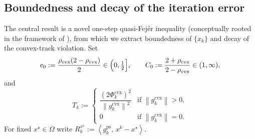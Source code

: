 \documentclass[]{interact}
\theoremstyle{plain}
\theoremstyle{definition}
\theoremstyle{remark}
\newcommand{\norm}[1]{\left\lVert #1 \right\rVert}
\newcommand{\inner}[2]{\left\langle #1,\, #2 \right\rangle}
\newcommand{\cvx}{\mathrm{cvx}}
\newcommand{\ps}{\mathrm{ps}}
\begin{document}
\subsection{Boundedness and decay of the iteration error}\label{ssec:bounded}
The central result is a novel one-step quasi-Fej\'er inequality (conceptually rooted in the framework of \citealt{combettes2001quasifejer}), from which we extract boundedness of $\{x_k\}$ and decay of the convex-track violation. Set
\begin{equation}\label{eq:c0C0}
c_0:=\frac{\rho_{\cvx}(2-\rho_{\cvx})}{2}\in\Bigl(0,\tfrac12\Bigr],\qquad
C_0:=\frac{2+\rho_{\cvx}}{2-\rho_{\cvx}}\in(1,\infty),
\end{equation}
and
\begin{equation}\label{eq:Tk}
T_k:=\begin{cases}\dfrac{(2\Phi^{\cvx}_k)^2}{\norm{g^{\cvx}_k}^2} & \text{if }\norm{g^{\cvx}_k}>0,\\ 0 & \text{if }\norm{g^{\cvx}_k}=0.\end{cases}
\end{equation}
For fixed $x^\star\in\Omega$ write $R^{x^\star}_k:=\inner{g^{\ps}_k}{x^k-x^\star}$.
\end{document}
